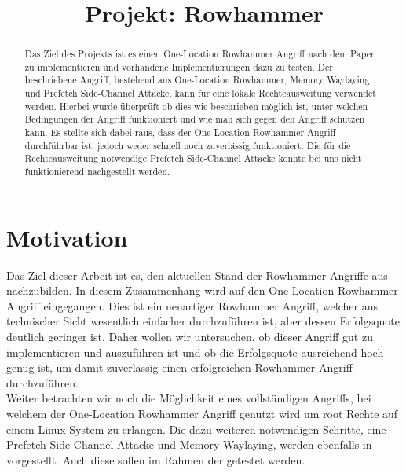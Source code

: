 \documentclass[conference]{IEEEtran}
\begin{document}
\title{Projekt: Rowhammer}


\author{
}
\maketitle

\begin{abstract}

Das Ziel des Projekts ist es einen One-Location Rowhammer Angriff nach dem Paper \cite{DBLP:journals/corr/abs-1710-00551} zu implementieren	und vorhandene Implementierungen dazu zu testen. Der beschriebene Angriff, bestehend aus One-Location Rowhammer, Memory Waylaying und Prefetch Side-Channel Attacke, kann für eine lokale Rechteausweitung verwendet werden. Hierbei wurde überprüft ob dies wie beschrieben möglich ist, unter welchen Bedingungen der Angriff funktioniert und wie man sich gegen den Angriff schützen kann. Es stellte sich dabei raus, dass der One-Location Rowhammer Angriff durchführbar ist, jedoch weder schnell noch zuverlässig funktioniert. Die für die Rechteausweitung notwendige Prefetch Side-Channel Attacke konnte bei uns nicht funktionierend nachgestellt werden.


\end{abstract}

\section{Motivation}
Das Ziel dieser Arbeit ist es, den aktuellen Stand der Rowhammer-Angriffe aus \cite{DBLP:journals/corr/abs-1710-00551} nachzubilden. In diesem Zusammenhang wird auf den One-Location Rowhammer Angriff eingegangen. Dies ist ein neuartiger Rowhammer Angriff, welcher aus technischer Sicht wesentlich einfacher durchzuführen ist, aber dessen Erfolgsquote deutlich geringer ist. Daher wollen wir untersuchen, ob dieser Angriff gut zu implementieren und auszuführen ist und ob die Erfolgsquote ausreichend hoch genug ist, um damit zuverlässig einen erfolgreichen Rowhammer Angriff durchzuführen.\\
Weiter betrachten wir noch die Möglichkeit eines vollständigen Angriffs, bei welchem der One-Location Rowhammer Angriff genutzt wird um root Rechte auf einem Linux System zu erlangen. Die dazu weiteren notwendigen Schritte, eine Prefetch Side-Channel Attacke und Memory Waylaying, werden ebenfalls in \cite{DBLP:journals/corr/abs-1710-00551} vorgestellt. Auch diese sollen im Rahmen der getestet werden. 
\end{document}
